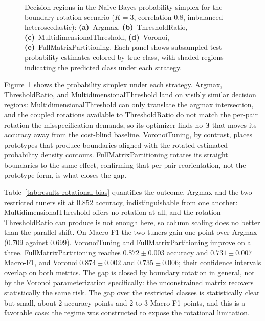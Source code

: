 \begin{figure}[H]
    \centering
    \resizebox{\textwidth}{!}{}
    \caption{Decision regions in the Naive Bayes probability simplex for the boundary rotation scenario ($K{=}3$, correlation $0.8$, imbalanced heteroscedastic): \textbf{(a)}~Argmax, \textbf{(b)}~ThresholdRatio, \textbf{(c)}~MultidimensionalThreshold, \textbf{(d)}~Voronoi, \textbf{(e)}~FullMatrixPartitioning. Each panel shows subsampled test probability estimates colored by true class, with shaded regions indicating the predicted class under each strategy.}\label{fig:simplex_regions}
\end{figure}

Figure~\ref{fig:simplex_regions} shows the probability simplex under each strategy. Argmax, ThresholdRatio, and MultidimensionalThreshold land on visibly similar decision regions: MultidimensionalThreshold can only translate the argmax intersection, and the coupled rotations available to ThresholdRatio do not match the per-pair rotation the misspecification demands, so its optimizer finds no $\boldsymbol{\beta}$ that moves its accuracy away from the cost-blind baseline. VoronoiTuning, by contrast, places prototypes that produce boundaries aligned with the rotated estimated probability density contours. FullMatrixPartitioning rotates its straight boundaries to the same effect, confirming that per-pair reorientation, not the prototype form, is what closes the gap.



Table~\ref{tab:results-rotational-bias} quantifies the outcome. Argmax and the two restricted tuners sit at $0.852$ accuracy, indistinguishable from one another: MultidimensionalThreshold offers no rotation at all, and the rotation ThresholdRatio can produce is not enough here, so column scaling does no better than the parallel shift. On Macro-F1 the two tuners gain one point over Argmax ($0.709$ against $0.699$). VoronoiTuning and FullMatrixPartitioning improve on all three. FullMatrixPartitioning reaches $0.872 \pm 0.003$ accuracy and $0.731 \pm 0.007$ Macro-F1, and Voronoi $0.874 \pm 0.002$ and $0.735 \pm 0.006$; their confidence intervals overlap on both metrics. The gap is closed by boundary rotation in general, not by the Voronoi parameterization specifically: the unconstrained matrix recovers statistically the same risk. The gap over the restricted classes is statistically clear but small, about $2$ accuracy points and $2$ to $3$ Macro-F1 points, and this is a favorable case: the regime was constructed to expose the rotational limitation.

